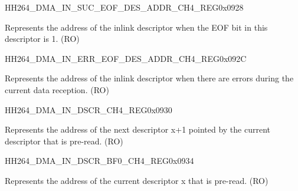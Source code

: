 \begin{register}{H}{H264\_DMA\_IN\_SUC\_EOF\_DES\_ADDR\_CH4\_REG}{0x0928}\label{regdesc:H264DMAINSUCEOFDESADDRCH4REG}
%
\regnewline%
\begin{regdesc}\begin{reglist}
\label{fielddesc:H264DMAINSUCEOFDESADDRCH4}\item [H264\_DMA\_IN\_SUC\_EOF\_DES\_ADDR\_CH4] Represents the address of the inlink descriptor when the EOF bit in this descriptor is 1. (RO)
\end{reglist}\end{regdesc}
\end{register}


\begin{register}{H}{H264\_DMA\_IN\_ERR\_EOF\_DES\_ADDR\_CH4\_REG}{0x092C}\label{regdesc:H264DMAINERREOFDESADDRCH4REG}
%
\regnewline%
\begin{regdesc}\begin{reglist}
\label{fielddesc:H264DMAINERREOFDESADDRCH4}\item [H264\_DMA\_IN\_ERR\_EOF\_DES\_ADDR\_CH4] Represents the address of the inlink descriptor when there are errors during the current data reception. (RO)
\end{reglist}\end{regdesc}
\end{register}


\begin{register}{H}{H264\_DMA\_IN\_DSCR\_CH4\_REG}{0x0930}\label{regdesc:H264DMAINDSCRCH4REG}
%
\regnewline%
\begin{regdesc}\begin{reglist}
\label{fielddesc:H264DMAINLINKDSCRCH4}\item [H264\_DMA\_INLINK\_DSCR\_CH4] Represents the address of the next descriptor x+1 pointed by the current descriptor that is pre-read. (RO)
\end{reglist}\end{regdesc}
\end{register}


\begin{register}{H}{H264\_DMA\_IN\_DSCR\_BF0\_CH4\_REG}{0x0934}\label{regdesc:H264DMAINDSCRBF0CH4REG}
%
\regnewline%
\begin{regdesc}\begin{reglist}
\label{fielddesc:H264DMAINLINKDSCRBF0CH4}\item [H264\_DMA\_INLINK\_DSCR\_BF0\_CH4] Represents the address of the current descriptor x that is pre-read. (RO)
\end{reglist}\end{regdesc}
\end{register}


